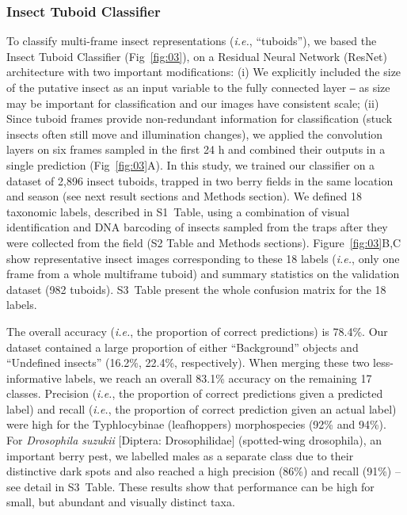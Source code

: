 \documentclass[12pt]{article}
\begin{document}
\begin{linenumbers}
		\subsubsection*{Insect Tuboid Classifier}
		
		To classify multi-frame insect representations (\emph{i.e.}, “tuboids”), we based the Insect Tuboid Classifier (Fig~\ref{fig:03}), on a Residual Neural Network (ResNet) architecture\cite{he_deep_2016} with two important modifications: (i) We explicitly included the size of the putative insect as an input variable to the fully connected layer ‒ as size may be important for classification and our images have consistent scale; (ii) Since tuboid frames provide non-redundant information for classification (stuck insects often still move and illumination changes), we applied the convolution layers on six frames sampled in the first 24 h and combined their outputs in a single prediction (Fig~\ref{fig:03}A). In this study, we trained our classifier on a dataset of 2,896 insect tuboids, trapped in two berry fields in the same location and season (see next result sections and Methods section). We defined 18 taxonomic labels, described in S1~Table, using a combination of visual identification and DNA barcoding of insects sampled from the traps after they were collected from the field (S2 Table and Methods sections). Figure~\ref{fig:03}B,C show representative insect images corresponding to these 18 labels (\emph{i.e.}, only one frame from a whole multiframe tuboid) and summary statistics on the validation dataset (982 tuboids).
		S3~Table present the whole confusion matrix for the 18 labels.
		
		 The overall accuracy (\emph{i.e.}, the proportion of correct predictions) is 78.4\%. Our dataset contained a large proportion of either “Background” objects and “Undefined insects” (16.2\%, 22.4\%, respectively). When merging these two less-informative labels, we reach an overall 83.1\% accuracy on the remaining 17 classes. Precision (\emph{i.e.}, the proportion of correct predictions given a predicted label) and recall (\emph{i.e.}, the proportion of correct prediction given an actual label) were high for the Typhlocybinae (leafhoppers) morphospecies (92\% and 94\%). For \emph{Drosophila suzukii} [Diptera: Drosophilidae] (spotted-wing drosophila), an important berry pest, we labelled males as a separate class due to their distinctive dark spots and also reached a high precision (86\%) and recall (91\%) -- see detail in S3~Table. These results show that performance can be high for small, but abundant and visually distinct taxa.
		

\end{linenumbers}
\end{document}
